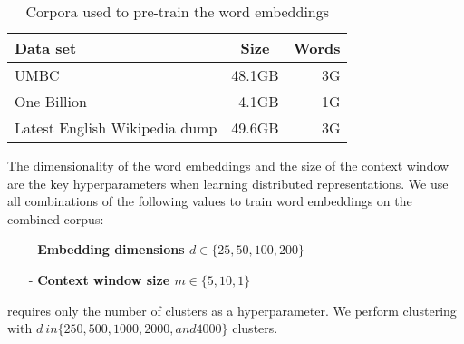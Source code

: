 \begin{table}[t]
\centering
\small
\begin{tabular}{lrr}
\hline
\textbf{Data set} & \multicolumn{1}{c}{\textbf{Size}} & \multicolumn{1}{c}{\textbf{Words}} \\ \hline
UMBC 	& 48.1GB & 3G \\
One Billion 	& 4.1GB & 1G  \\
Latest English Wikipedia dump & 49.6GB & 3G \\ \hline
\end{tabular}
\caption{Corpora used to pre-train the word embeddings}
\label{wordEmbedCorpora}
\end{table}

The dimensionality of the word embeddings and the size of the context
window are the key hyperparameters when learning distributed
representations. We use all combinations of the following values to
train word embeddings on the combined corpus:
\begin{itemize}\small
\item[-]\textbf{Embedding dimensions $d \in \{25, 50, 100, 200\}$}
\item[-]\textbf{Context window size $m \in \{5, 10, 1\}$}
\end{itemize}
\brown requires only the number of clusters as a hyperparameter. We
perform clustering with $d\ in \{250, 500, 1000, 2000, and 4000\}$ clusters.
%
%
%
%
%

